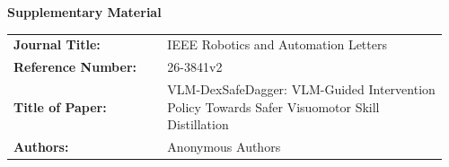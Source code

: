 \documentclass[10pt]{article}
\newcommand{\manuscriptid}{26-3841v2}
\newcommand{\papertitle}{VLM-DexSafeDagger: VLM-Guided Intervention Policy Towards Safer Visuomotor Skill Distillation}
\begin{document}
\begin{center}
  {\Large\bfseries Supplementary Material}\par
\end{center}

\vspace{0.8em}
\begin{tabular}{@{}p{0.34\linewidth}p{0.62\linewidth}@{}}
\textbf{Journal Title:} & IEEE Robotics and Automation Letters \\
\textbf{Reference Number:} & \manuscriptid \\
\textbf{Title of Paper:} & \papertitle \\
\textbf{Authors:} & Anonymous Authors
\end{tabular}

\vspace{0.8em}
\appendix

\end{document}
